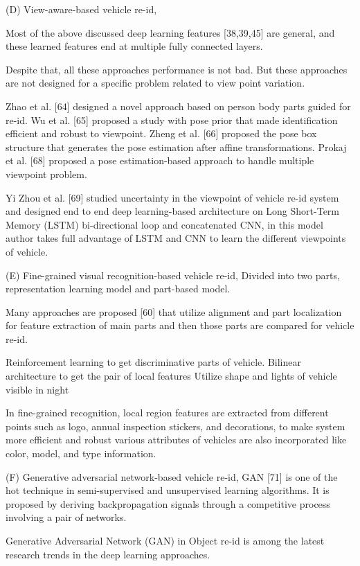 	
(D) View-aware-based vehicle re-id,

	Most of the above discussed deep learning features [38,39,45] are general, and these
learned features end at multiple fully connected layers. 
	
	Despite that, all these approaches
performance is not bad. But these approaches are not designed for a specific problem
related to view point variation. 
	
	Zhao et al. [64]
designed a novel approach based
on person body parts guided for re-id. Wu et al. [65] proposed a study with pose prior
	that made identification efficient and robust to viewpoint. Zheng et al. [66] proposed
the pose box structure that generates the pose estimation after affine transformations. Prokaj et al. [68] proposed a pose estimation-based approach to handle multiple
viewpoint problem.
	
	Yi Zhou et al. [69] studied uncertainty in the viewpoint of vehicle re-id
system and designed end to end deep learning-based architecture on Long Short-Term
Memory (LSTM) bi-directional loop and concatenated CNN, in this model author takes
full advantage of LSTM and CNN to learn the different viewpoints of vehicle. 
	
(E) Fine-grained visual recognition-based vehicle re-id, 
	Divided into two parts, representation learning model and part-based model. 
	
	Many
approaches are proposed [60] that utilize alignment and part localization for feature extraction of main parts and then those parts are compared for vehicle re-id. 
	
		Reinforcement learning to get
discriminative parts of vehicle.
		Bilinear architecture
to get the pair of local features
		Utilize shape and lights of vehicle visible in night 
		
		
	In fine-grained recognition, local region features are extracted from different points
such as logo, annual inspection stickers, and decorations, to make system more efficient
and robust various attributes of vehicles are also incorporated like color, model, and type
information. 
	
(F) Generative adversarial network-based vehicle re-id, 
	GAN [71] is one of the hot technique in semi-supervised and unsupervised learning
algorithms. It is proposed by deriving backpropagation signals through
a competitive process involving a pair of networks. 
	
	Generative Adversarial Network (GAN) in Object re-id is among the
	latest research trends in the deep learning approaches. 
	
